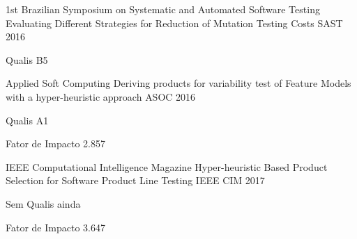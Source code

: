 

\begin{cventries}

\cventry
	{1st Brazilian Symposium on Systematic and Automated Software Testing} %
	{Evaluating Different Strategies for Reduction of Mutation Testing Costs} %
	{SAST} %
	{2016} %
	{
		\begin{cvitems} %
			\item {Qualis B5}
		\end{cvitems}
	}

\cventry
	{Applied Soft Computing} %
	{Deriving products for variability test of Feature Models with a hyper-heuristic approach} %
	{ASOC} %
	{2016} %
	{
		      \begin{cvitems} %
		        \item {Qualis A1}
		        \item {Fator de Impacto 2.857}
		      \end{cvitems}
	}

  \cventry
    {IEEE Computational Intelligence Magazine} %
    {Hyper-heuristic Based Product Selection for Software Product Line Testing} %
    {IEEE CIM} %
    {2017} %
	{
	     \begin{cvitems} %
    		\item {Sem Qualis ainda}
    		\item {Fator de Impacto 3.647}
    	\end{cvitems}
    }

\end{cventries}
